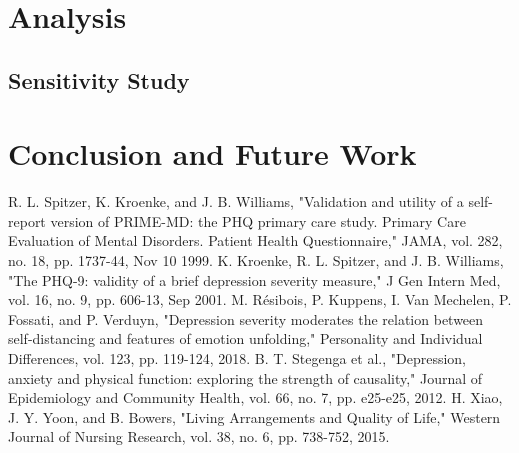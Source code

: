 \documentclass[runningheads]{llncs}
\begin{document}
\section{Analysis}
\subsection{Sensitivity Study}
%
%
\pagebreak
\section{Conclusion and Future Work}
%
%
%
\begin{thebibliography}{8}
%
	R. L. Spitzer, K. Kroenke, and J. B. Williams, "Validation and utility of a self-report version of PRIME-MD: the PHQ primary care study. Primary Care Evaluation of Mental Disorders. Patient Health Questionnaire," JAMA, vol. 282, no. 18, pp. 1737-44, Nov 10 1999.
%
	K. Kroenke, R. L. Spitzer, and J. B. Williams, "The PHQ-9: validity of a brief depression severity measure," J Gen Intern Med, vol. 16, no. 9, pp. 606-13, Sep 2001.
%
	M. Résibois, P. Kuppens, I. Van Mechelen, P. Fossati, and P. Verduyn, "Depression severity moderates the relation between self-distancing and features of emotion unfolding," Personality and Individual Differences, vol. 123, pp. 119-124, 2018.
%
	B. T. Stegenga et al., "Depression, anxiety and physical function: exploring the strength of causality," Journal of Epidemiology and Community Health, vol. 66, no. 7, pp. e25-e25, 2012.
%
	H. Xiao, J. Y. Yoon, and B. Bowers, "Living Arrangements and Quality of Life," Western Journal of Nursing Research, vol. 38, no. 6, pp. 738-752, 2015.
%
%
%
%
%
%
%
%
%
%
%
%
%
%
%
%
%
%
\end{thebibliography}
\end{document}
